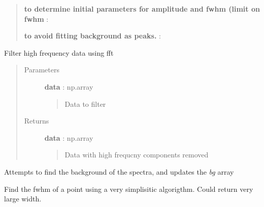 \documentclass[letterpaper,10pt,english]{sphinxmanual}
\begin{document}
\begin{fulllineitems}
\begin{fulllineitems}
\begin{quote}
\begin{description}
\textbf{to determine initial parameters for amplitude and fwhm (limit on fwhm} :

\textbf{to avoid fitting background as peaks.} :

\end{description}\end{quote}

\end{fulllineitems}


\begin{fulllineitems}
\label{spectra:spectra.Spectra.filter_high_freq}
Filter high frequency data using fft
\begin{quote}\begin{description}
\item[{Parameters}] \leavevmode
\textbf{data} : np.array
\begin{quote}

Data to filter
\end{quote}

\item[{Returns}] \leavevmode
\textbf{data} : np.array
\begin{quote}

Data with high frequcny components removed
\end{quote}

\end{description}\end{quote}

\end{fulllineitems}


\begin{fulllineitems}
\label{spectra:spectra.Spectra.find_background}
Attempts to find the background of the spectra, 
and updates the \emph{bg} array

\end{fulllineitems}


\begin{fulllineitems}
\label{spectra:spectra.Spectra.find_fwhm}
Find the fwhm of a point using a very simplisitic algorigthm. 
Could return very large width.


\end{fulllineitems}
\end{fulllineitems}
\end{document}
